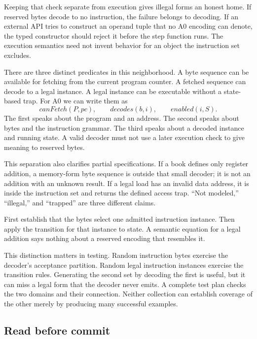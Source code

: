 Keeping that check separate from execution gives illegal forms an honest
home. If reserved bytes decode to no instruction, the failure belongs to
decoding. If an external API tries to construct an operand tuple that no A0
encoding can denote, the typed constructor should reject it before the step
function runs. The execution semantics need not invent behavior for an object
the instruction set excludes.

There are three distinct predicates in this neighborhood. A byte sequence can
be available for fetching from the current program counter. A fetched sequence can decode
to a legal instance. A legal instance can be executable without a state-based
trap. For A0 we can write them as
\[
 \mathit{canFetch}(P,pc),\qquad
 \mathit{decodes}(b,i),\qquad
 \mathit{enabled}(i,S).
\]
The first speaks about the program and an address. The second speaks about
bytes and the instruction grammar. The third speaks about a decoded instance
and running state. A valid decoder must not use a later execution check to
give meaning to reserved bytes.

This separation also clarifies partial specifications. If a book defines only
register addition, a memory-form byte sequence is outside that small decoder;
it is not an addition with an unknown result. If a legal load has an invalid
data address, it is inside the instruction set and returns the defined access
trap. ``Not modeled,'' ``illegal,'' and ``trapped'' are three different
claims.

\begin{keyidea}[title={Legality precedes effect}]
First establish that the bytes select one admitted instruction instance. Then
apply the transition for that instance to state. A semantic equation for a
legal addition says nothing about a reserved encoding that resembles it.
\end{keyidea}

This distinction matters in testing. Random instruction bytes exercise the
decoder's acceptance partition. Random legal instruction instances exercise
the transition rules. Generating the second set by decoding the first is
useful, but it can miss a legal form that the decoder never emits. A complete
test plan checks the two domains and their connection.
Neither collection can establish coverage of the other merely by producing
many successful examples.

\subsection{Read before commit}

